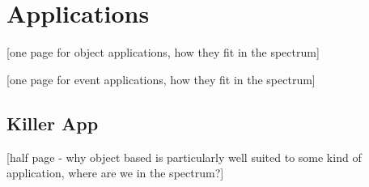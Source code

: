 \documentclass{acm_proc_article-sp}
\begin{document}
% 
% 
% 
% 
% 
% 
% 
% 
% 
% 
% 
% 



\section{Applications}

[one page for object applications, how they fit in the spectrum]

[one page for event applications, how they fit in the spectrum]


\subsection{Killer App}

[half page - why object based is particularly well suited to some kind of application, where are we in the spectrum?]
\end{document}
